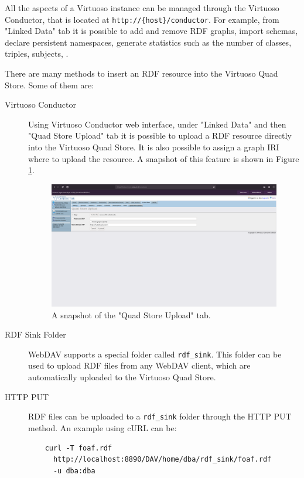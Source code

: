 All the aspects of a Virtuoso instance can be managed through the Virtuoso Conductor, that is located at \verb#http://{host}/conductor#. For example, from "Linked Data" tab it is possible to add and remove \ac{RDF} graphs, import schemas, declare persistent namespaces, generate statistics such as the number of classes, triples, subjects, \etc.

There are many methods to insert an \ac{RDF} resource into the Virtuoso Quad Store. Some of them are:

\begin{description}
  \item[Virtuoso Conductor] Using Virtuoso Conductor web interface, under "Linked Data" and then "Quad Store Upload" tab it is possible to upload a \ac{RDF} resource directly into the Virtuoso Quad Store. It is also possible to assign a graph \ac{IRI} where to upload the resource. A snapshot of this feature is shown in Figure \ref{fig:virtuoso-upload}.
  \begin{figure}[!ht]
    \centering
    \includegraphics[width=\columnwidth]{images/virtuoso/virtuoso-upload}
    \caption{A snapshot of the "Quad Store Upload" tab.}
    \label{fig:virtuoso-upload}
  \end{figure}

  \item[RDF Sink Folder] WebDAV supports a special folder called \verb#rdf_sink#. This folder can be used to upload \ac{RDF} files from any WebDAV client, which are automatically uploaded to the Virtuoso Quad Store.

  \item[\ac{HTTP} PUT] \ac{RDF} files can be uploaded to a \verb#rdf_sink# folder through the \ac{HTTP} PUT method. An example using cURL can be:
  \begin{verbatim}
    curl -T foaf.rdf
      http://localhost:8890/DAV/home/dba/rdf_sink/foaf.rdf
      -u dba:dba
  \end{verbatim}


\end{description}
